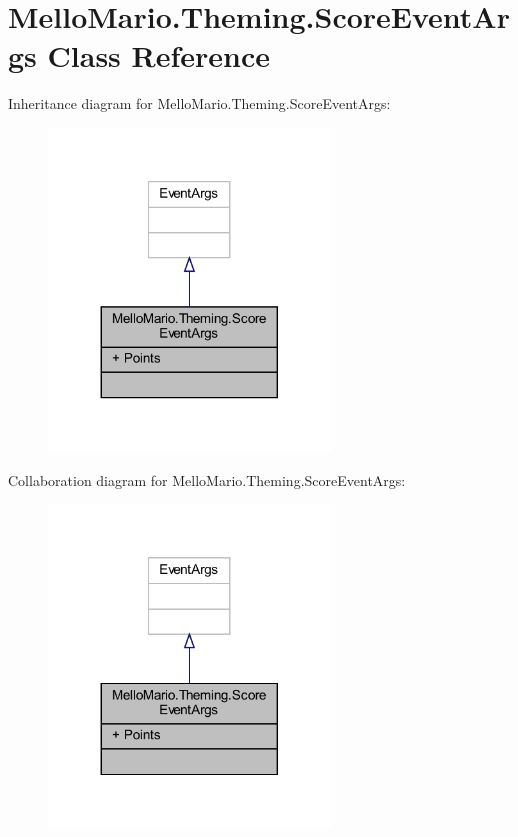 \section{Mello\+Mario.\+Theming.\+Score\+Event\+Args Class Reference}
\label{classMelloMario_1_1Theming_1_1ScoreEventArgs}


Inheritance diagram for Mello\+Mario.\+Theming.\+Score\+Event\+Args\+:
\nopagebreak
\begin{figure}[H]
\begin{center}
\leavevmode
\includegraphics[width=212pt]{classMelloMario_1_1Theming_1_1ScoreEventArgs__inherit__graph}
\end{center}
\end{figure}


Collaboration diagram for Mello\+Mario.\+Theming.\+Score\+Event\+Args\+:
\nopagebreak
\begin{figure}[H]
\begin{center}
\leavevmode
\includegraphics[width=212pt]{classMelloMario_1_1Theming_1_1ScoreEventArgs__coll__graph}
\end{center}
\end{figure}
